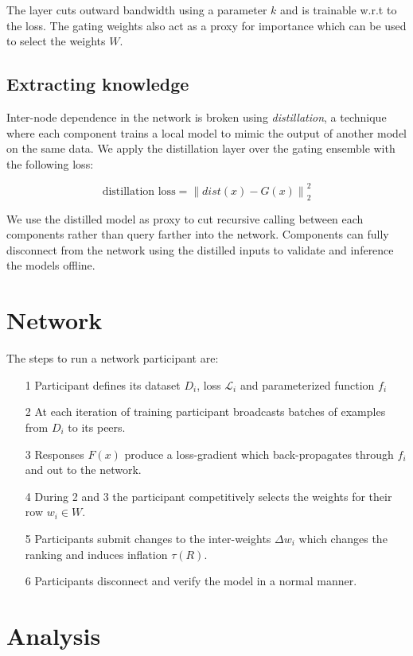 \documentclass{article}
\begin{document}
The layer cuts outward bandwidth using a parameter $k$ and is trainable w.r.t to the loss. The gating weights also act as a proxy for importance which can be used to select the weights $W$.

\subsection{Extracting knowledge}

Inter-node dependence in the network is broken using \textit{distillation}, a technique where each component trains a local model to mimic the output of another model on the same data. We apply the distillation layer over the gating ensemble with the following loss:
\smallskip

\[ \textrm{distillation loss} = \left\| dist(x) - G(x) \right\|^2_2 \]

We use the distilled model as proxy to cut recursive calling between each components rather than query farther into the network. Components can fully disconnect from the network using the distilled inputs to validate and inference the models offline.
\smallskip

\section{Network}

The steps to run a network participant are:

\begin{itemize}

\item[1]  Participant defines its dataset $D_i$, loss $\mathcal{L}_i$ and parameterized function $f_i$
\item[2]  At each iteration of training participant broadcasts batches of examples from $D_i$ to its peers.
\item[3]  Responses $F(x)$ produce a loss-gradient which back-propagates through $f_i$ and out to the network.
\item[4]  During 2 and 3 the participant competitively selects the weights for their row $w_i \in W$.
\item[5]  Participants submit changes to the inter-weights $\Delta w_i$ which changes the ranking and induces inflation $\tau(R)$.
\item[6]  Participants disconnect and verify the model in a normal manner.
\end{itemize}


\section{Analysis}
\end{document}
